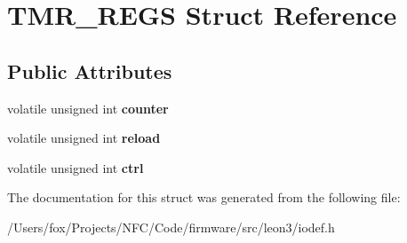 \hypertarget{struct_t_m_r___r_e_g_s}{
\section{TMR\_\-REGS Struct Reference}
\label{struct_t_m_r___r_e_g_s}
}
\subsection*{Public Attributes}
\begin{DoxyCompactItemize}
\item 
\hypertarget{struct_t_m_r___r_e_g_s_aa941802883e8801d892804ed3d21fd0f}{
volatile unsigned int {\bfseries counter}}
\label{struct_t_m_r___r_e_g_s_aa941802883e8801d892804ed3d21fd0f}

\item 
\hypertarget{struct_t_m_r___r_e_g_s_a27016b435803031ad372d38498b039d6}{
volatile unsigned int {\bfseries reload}}
\label{struct_t_m_r___r_e_g_s_a27016b435803031ad372d38498b039d6}

\item 
\hypertarget{struct_t_m_r___r_e_g_s_af1b19bccf06fc82a470a37ba5f41d7a6}{
volatile unsigned int {\bfseries ctrl}}
\label{struct_t_m_r___r_e_g_s_af1b19bccf06fc82a470a37ba5f41d7a6}

\end{DoxyCompactItemize}


The documentation for this struct was generated from the following file:\begin{DoxyCompactItemize}
\item 
/Users/fox/Projects/NFC/Code/firmware/src/leon3/iodef.h\end{DoxyCompactItemize}
